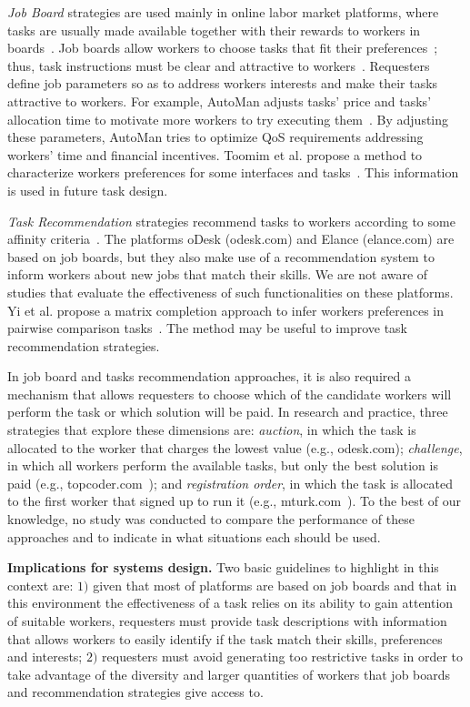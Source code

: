 \documentclass[11pt]{bmc_article_s50}
\begin{document}
\textit{Job Board} strategies are used mainly in online labor market platforms, where tasks are usually made available together with their rewards to workers in boards~\cite{Chilton:HCOMP:2010}. {\color{black}Job boards allow workers to choose tasks that fit their preferences~\cite{Lee:2013}; thus, task instructions must be clear and attractive to workers~\cite{Jason:2013}}. Requesters define job parameters so as to address workers interests and make their tasks attractive to workers. For example, AutoMan adjusts tasks' price and tasks' allocation time to motivate more workers to try executing them~\cite{Barowy:2012}. By adjusting these parameters, AutoMan tries to optimize QoS requirements addressing workers' time and financial incentives. Toomim et al. propose a method to characterize workers preferences for some interfaces and tasks~\cite{Toomim:CHI:2011}. This information is used in future task design.

\textit{Task Recommendation} strategies recommend tasks to workers according to some affinity criteria~\cite{Ambati:HCOMP:2012}. The platforms oDesk (odesk.com) and Elance (elance.com) are based on job boards, but they also make use of a recommendation system to inform workers about new jobs that match their skills. We are not aware of studies that evaluate the effectiveness of such functionalities on these platforms. {\color{black}Yi et al. propose a matrix completion approach to infer workers preferences in pairwise comparison tasks~\cite{Yi:2013}. The method may be useful to improve task recommendation strategies.}

In job board and tasks recommendation approaches, it is also required a mechanism that allows requesters to choose which of the candidate workers will perform the task or which solution will be paid. In research and practice, three strategies that explore these dimensions are: \textit{auction}, in which the task is allocated to the worker that charges the lowest value (e.g., odesk.com); \textit{challenge}, in which all workers perform the available tasks, but only the best solution is paid (e.g., topcoder.com~\cite{Archak:2010}); and \textit{registration order}, in which the task is allocated to the first worker that signed up to run it (e.g., mturk.com~\cite{Chen:chiHcomp:2011}). To the best of our knowledge, no study was conducted to compare the performance of these approaches and to indicate in what situations each should be used.

\textbf{Implications for systems design.} Two basic guidelines to highlight in this context are: $1)$ given that most of platforms are based on job boards and that in this environment the effectiveness of a task relies on its ability to gain attention of suitable workers, requesters must provide task descriptions with information that allows workers to easily identify if the task match their skills, preferences and interests; $2)$ requesters must avoid generating too restrictive tasks in order to take advantage of the diversity and larger quantities of workers that job boards and recommendation strategies give access to.
\end{document}
